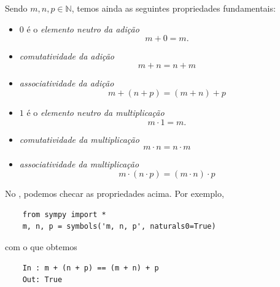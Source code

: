 Sendo $m, n, p\in\mathbb{N}$, temos ainda as seguintes propriedades fundamentais:
\begin{itemize}
\item $0$ é o \emph{elemento neutro da adição}
  \begin{equation}
    m + 0 = m.
  \end{equation}
\item \emph{comutatividade da adição}
  \begin{equation}
    m + n = n + m
  \end{equation}
\item \emph{associatividade da adição}
  \begin{equation}
    m + (n + p) = (m + n) + p
  \end{equation}
\item $1$ é o \emph{elemento neutro da multiplicação}
  \begin{equation}
    m \cdot 1 = m.
  \end{equation}
\item \emph{comutatividade da multiplicação}
  \begin{equation}
    m \cdot n = n \cdot m
  \end{equation}
\item \emph{associatividade da multiplicação}
  \begin{equation}
    m \cdot (n \cdot p) = (m \cdot n) \cdot p
  \end{equation}
\end{itemize}

\ifispython
\begin{obs}
  No \python, podemos checar as propriedades acima. Por exemplo,
  \begin{lstlisting}
    from sympy import *
    m, n, p = symbols('m, n, p', naturals0=True)
  \end{lstlisting}
  com o que obtemos
  \begin{lstlisting}
    In : m + (n + p) == (m + n) + p
    Out: True
  \end{lstlisting}
\end{obs}
\fi

